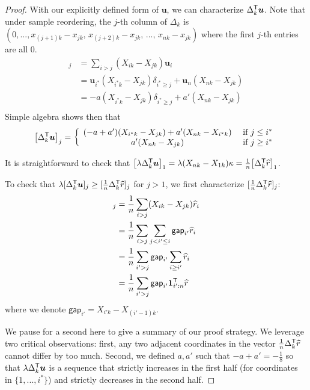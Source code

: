 \begin{proof}
With our explicitly defined form of $\mathbf{u}$, we can characterize $\Delta_k^{\mathsf{T}} \mbox{\boldmath $u$}$. Note that under sample reordering, the $j$-th column of $\Delta_k$ is $(0, ..., x_{(j+1)k} - x_{jk},\, x_{(j+2)k} - x_{jk},\, ...,\, x_{nk} - x_{jk} )$ where the first $j$-th entries are all 0. 
\begin{align*}
[\Delta_k^\tran \mathbf{u}]_j &= \sum_{i > j} (X_{ik} - X_{jk}) \mathbf{u}_i \\
  &= \mathbf{u}_{i^*} (X_{i^*k} - X_{jk}) \delta_{i^* \geq j} + \mathbf{u}_n (X_{nk} - X_{jk})\\ 
  &= -a (X_{i^*k} - X_{jk}) \delta_{i^* \geq j} + a' (X_{nk} - X_{jk}) \\
\end{align*}
Simple algebra shows then that
\begin{align}
\big[ \Delta_k^{\mathsf{T}} \mbox{\boldmath $u$} \big]_j = 
  \left \{ \begin{array}{cc} 
   (-a + a')(X_{i^*k} - X_{jk})+ a'(X_{nk} - X_{ i^*k})
   & \textrm{ if } j \leq i^* \\
   a'(X_{nk} - X_{jk}) & \textrm{ if } j \geq i^* 
     \end{array} \right.
\end{align} 

It is straightforward to check that $\big[ \lambda \Delta_k^{\mathsf{T}} \mbox{\boldmath $u$} \big]_1 = \lambda (X_{nk} - X_{1k}) \kappa = \frac{1}{n} \big[ \Delta_k^{\mathsf{T}} \widehat{r} \big]_1$.

To check that $\lambda [ \Delta_k^{\mathsf{T}} \mbox{\boldmath $u$} ]_j \geq [ \frac{1}{n} \Delta_k^{\mathsf{T}} \widehat{r}]_j$ for $j > 1$, we first characterize $[\frac{1}{n} \Delta_k^{\mathsf{T}} \widehat{r}]_j$:
\begin{align*}
[\frac{1}{n} \Delta_k^\tran \hat{r}]_j &= \frac{1}{n} \sum_{i > j} (X_{ik} - X_{jk}) \hat{r}_i \\
  & = \frac{1}{n} \sum_{i > j} \sum_{j < i' \leq i} \mathsf{gap}_{i'} \hat{r}_i \\
 & = \frac{1}{n} \sum_{i' > j} \mathsf{gap}_{i'} \sum_{i \geq i'} \hat{r}_i \\
 & = \frac{1}{n} \sum_{i' > j} \mathsf{gap}_{i'} \mathbf{1}_{i':n}^\tran \hat{r} 
\end{align*}
where we denote $\mathsf{gap}_{i'} = X_{i'k} - X_{(i'-1)k}$.

We pause for a second here to give a summary of our proof strategy. We leverage two critical observations: first, any two adjacent coordinates in the vector $\frac{1}{n} \Delta_k^{\mathsf{T}} \widehat{r}$ cannot differ by too much. Second, we defined $a, a'$ such that $-a+a' = -\frac{1}{8}$ so that $\lambda \Delta_k^{\mathsf{T}} \mbox{\boldmath $u$}$ is a sequence that strictly increases in the first half (for coordinates in $\{1,...,i^*\}$) and strictly decreases in the second half. 


\end{proof}
